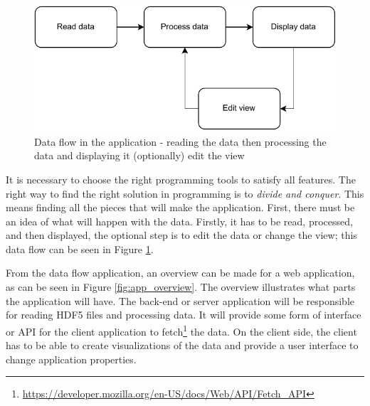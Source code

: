 
\begin{figure}[h]
    \centering
    \includegraphics{pdf/simple_application.drawio.pdf}
    \caption{Data flow in the application - reading the data then processing the data and displaying it (optionally) edit the view}
    \label{fig:dataflow}
\end{figure}

It is necessary to choose the right programming tools to satisfy all features. The right way to find the right solution in programming is to \textit{divide and conquer}. This means finding all the pieces that will make the application. First, there must be an idea of what will happen with the data. Firstly, it has to be read, processed, and then displayed, the optional step is to edit the data or change the view; this data flow can be seen in Figure \ref{fig:dataflow}. 


From the data flow application, an overview can be made for a web application, as can be seen in Figure \ref{fig:app_overview}. The overview illustrates what parts the application will have. The back-end or server application will be responsible for reading HDF5 files and processing data. It will provide some form of interface or API for the client application to fetch\footnote{\url{https://developer.mozilla.org/en-US/docs/Web/API/Fetch\_API}} the data. On the client side, the client has to be able to create visualizations of the data and provide a user interface to change application properties.

